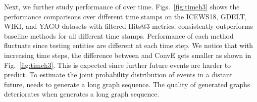 Next, we further study performance of \method over time. 
Figs.~\ref{fig:timeh3} shows the performance comparisons over different time stamps on the ICEWS18, GDELT, WIKI, and YAGO datasets with filtered Hits@3 metrics.
\method consistently outperforms baseline methods for all different time stamps.
Performance of each method fluctuate since testing entities are different at each time step.
We notice that with increasing time steps, the difference between \method and ConvE gets smaller as shown in Fig.~\ref{fig:timeh3}.
This is expected since further future events are harder to predict.
To estimate the joint probability distribution of events in a distant future, \method needs to generate a long graph sequence.
The quality of generated graphs deteriorates when \method generates a long graph sequence. 


\begin{table}[tb!]
\centering
\caption{\textbf{Ablation study on the ICEWS18 and GDELT datasets.}
}
\label{result:aggre}
\end{table}





